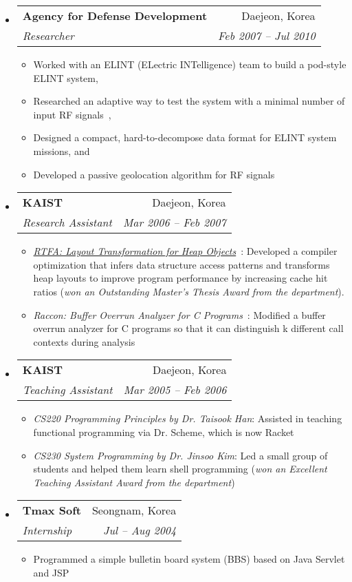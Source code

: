 \documentclass[letterpaper,11pt]{article}
\makeatletter
\newcommand{\ressubheading}[4]{
\begin{tabular*}{6.5in}{l@{\extracolsep{\fill}}r}
    \textbf{#1} & #2 \\
    \textit{#3} & \textit{#4} \\
\end{tabular*}\vspace{-6pt}}
\makeatother
\begin{document}
\begin{itemize}
    \item
      \ressubheading{{Agency for Defense Development}}{Daejeon, Korea}{Researcher}{Feb 2007 -- Jul 2010}
        {
\small
        \begin{itemize}
\item Worked with an ELINT (ELectric INTelligence) team to build a pod-style ELINT system,
\item Researched an adaptive way to test the system with
a minimal number of input RF signals~\cite{valid09},
\item Designed a compact, hard-to-decompose data format for ELINT system missions, and
\item Developed a passive geolocation algorithm for RF signals
        \end{itemize}
        }
    \item
      \ressubheading{{KAIST}}{Daejeon, Korea}{Research Assistant}{Mar 2006 -- Feb 2007}
        {
\small
        \begin{itemize}
\item\emph{\href{https://github.com/jsjeon/rtfa}{RTFA: Layout Transformation for Heap Objects}}~\cite{TACO09, cc07}:
Developed a compiler optimization that infers data structure access patterns
and transforms heap layouts to improve program performance
by increasing cache hit ratios
(\emph{won an Outstanding Master's Thesis Award from the department}).
\item\emph{Raccon: Buffer Overrun Analyzer for C Programs}~\cite{KIISE05, kcc06}:
Modified a buffer overrun analyzer for C programs so that
it can distinguish k different call contexts during analysis
        \end{itemize}
        }
    \item
      \ressubheading{KAIST}{Daejeon, Korea}{Teaching Assistant}{Mar 2005 -- Feb 2006}
        {
\small
        \begin{itemize}
\item\emph{CS220 Programming Principles by Dr. Taisook Han}:
Assisted in teaching functional programming via Dr. Scheme, which is now Racket
\item\emph{CS230 System Programming by Dr. Jinsoo Kim}:
Led a small group of students and helped them learn shell programming
(\emph{won an Excellent Teaching Assistant Award from the department})
        \end{itemize}
        }
    \item
      \ressubheading{Tmax Soft}{Seongnam, Korea}{Internship}{Jul -- Aug 2004}
        {
\small
        \begin{itemize}
\item Programmed a simple bulletin board system (BBS) based on Java Servlet and JSP
        \end{itemize}
        }
\end{itemize}  %
\end{document}
